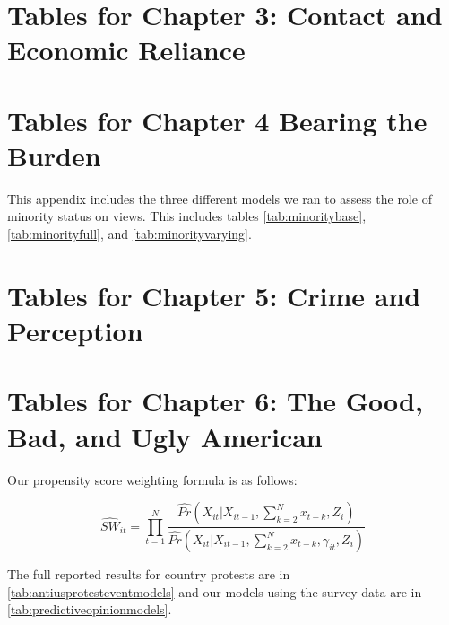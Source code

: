 


\appendix



\chapter{Tables for Chapter 3: Contact and Economic Reliance}

\vspace*{-4cm}


\chapter{Tables for Chapter 4 Bearing the Burden}

This appendix includes the three different models we ran to assess the role of minority status on views. This includes tables \ref{tab:minoritybase}, \ref{tab:minorityfull}, and \ref{tab:minorityvarying}. %

\vspace*{-4cm}


\vspace*{-4cm}


\vspace*{-4cm}

\chapter{Tables for Chapter 5: Crime and Perception}

\chapter{Tables for Chapter 6: The Good, Bad, and Ugly American}

Our propensity score weighting formula is as follows: 

\begin{equation}
	\hat{SW}_{it} = \prod_{t=1}^{N} \frac{{{\hat{Pr}(X_{it} | X_{it-1}, \displaystyle \sum_{k = 2}^{N} x_{t-k}  , Z_{i})}}}{\hat{Pr}(X_{it} | X_{it-1} ,  \displaystyle \sum_{k = 2}^{N} x_{t-k}, \gamma_{it} ,Z_{i})} 
	\label{eq:structuralweights}
\end{equation}

The full reported results for country protests are in \ref{tab:antiusprotesteventmodels} and our models using the survey data are in \ref{tab:predictiveopinionmodels}. %




